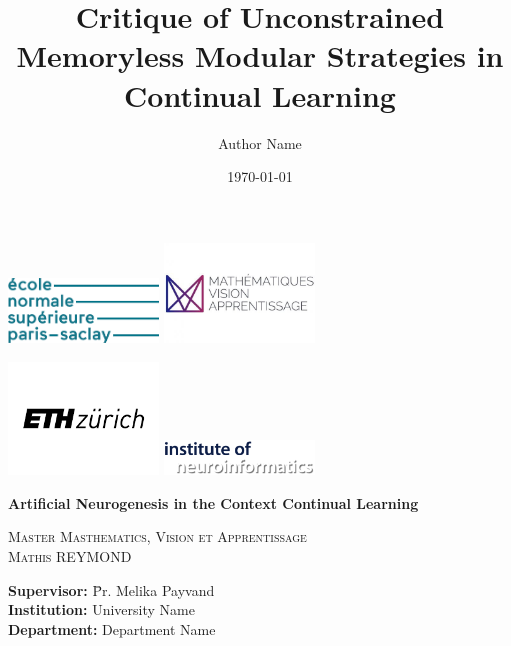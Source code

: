 \documentclass[11pt]{article}
\title{Critique of Unconstrained Memoryless Modular Strategies in Continual Learning}
\author{Author Name}
\date{\today}
\begin{document}
\begin{titlepage}
    \centering
    \includegraphics[width=0.3\textwidth]{images/logo_ENS.png} \hfill %
    \includegraphics[width=0.3\textwidth]{images/logo_MVA.png} \hfill %
    \vspace{1cm}
    
    \includegraphics[width=0.3\textwidth]{images/logo_ETH.png} \hfill %
    \includegraphics[width=0.3\textwidth]{images/logo_INI.png} \hfill %
    \vfill
    
    {\huge \bfseries Artificial Neurogenesis in the Context Continual Learning \\[0.4cm]} %
    
    \textsc{\LARGE Master Masthematics, Vision et Apprentissage}\\[1.5cm] %
    
    \textsc{\Large Mathis REYMOND}\\[0.5cm] %
    
    \vfill
    
    \Large
    \begin{tabbing}
        \hspace{4cm} \= \textbf{Supervisor:} \hspace{1cm} \= Pr. Melika Payvand \\ %
        \hspace{4cm} \= \textbf{Institution:} \> University Name \\ %
        \hspace{4cm} \= \textbf{Department:} \> Department Name \\ %
    \end{tabbing}
    

\end{titlepage}
\end{document}
